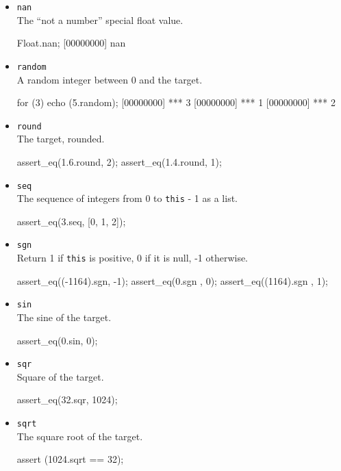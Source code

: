 \begin{itemize}
\item \lstinline|nan|\\
  The ``not a number'' special float value.
\begin{urbiscript}[firstnumber=last]
Float.nan;
[00000000] nan
\end{urbiscript}

\item \lstinline|random|\\
  A random integer between 0 and the target.
\begin{urbiscript}[firstnumber=last]
for (3)
  echo (5.random);
[00000000] *** 3
[00000000] *** 1
[00000000] *** 2
\end{urbiscript}

\item \lstinline|round|\\
  The target, rounded.
\begin{urbiscript}[firstnumber=last]
assert_eq(1.6.round, 2);
assert_eq(1.4.round, 1);
\end{urbiscript}

\item \lstinline|seq|\\
  The sequence of integers from 0 to \lstinline|this| - 1 as a list.
\begin{urbiscript}[firstnumber=last]
assert_eq(3.seq, [0, 1, 2]);
\end{urbiscript}

\item \lstinline|sgn|\\
  Return 1 if \lstinline|this| is positive, 0 if it is null, -1
  otherwise.
\begin{urbiscript}[firstnumber=last]
assert_eq((-1164).sgn, -1);
assert_eq(0.sgn      , 0);
assert_eq((1164).sgn , 1);
\end{urbiscript}

\item \lstinline|sin|\\
  The sine of the target.
\begin{urbiscript}[firstnumber=last]
assert_eq(0.sin, 0);
\end{urbiscript}

\item \lstinline|sqr|\\
  Square of the target.
\begin{urbiscript}[firstnumber=last]
assert_eq(32.sqr, 1024);
\end{urbiscript}

\item \lstinline|sqrt|\\
  The square root of the target.
\begin{urbiscript}[firstnumber=last]
assert (1024.sqrt == 32);
\end{urbiscript}


\end{itemize}

